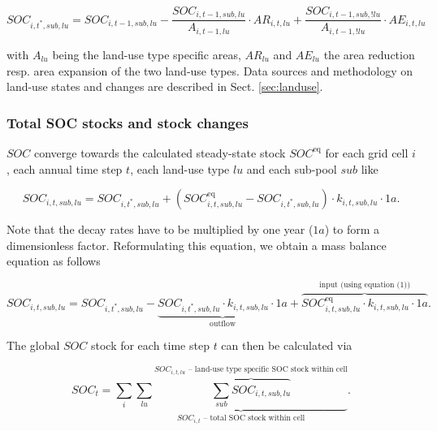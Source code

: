\documentclass[gc, manuscript]{copernicus}
\begin{document}
\begin{equation}
SOC_{i,t^*,sub,lu} = SOC_{i,t-1,sub,lu} - \frac{SOC_{i,t-1,sub,lu}}{A_{i,t-1,lu}} \cdot  AR_{i,t,lu} + \frac{SOC_{i,t-1,sub,!lu}}{A_{i,t-1,!lu}} \cdot  AE_{i,t,lu}
\label{eq:ctransfer}
\end{equation}

with \(A_{lu}\) being the land-use type specific areas, \(AR_{lu}\) and \(AE_{lu}\) the area reduction resp. area expansion of the two land-use types. Data sources and methodology on land-use states and changes are described in Sect. \ref{sec:landuse}.

\hypertarget{sec:totalsoc}{%
\subsubsection{Total SOC stocks and stock changes}\label{sec:totalsoc}}

\(SOC\) converge towards the calculated steady-state stock \(SOC^{\mathrm{eq}}\) for each grid cell \(i\), each annual time step \(t\), each land-use type \(lu\) and each sub-pool \(sub\) like

\begin{equation}
SOC_{i,t,sub,lu} = SOC_{i,t^*,sub,lu} + (SOC^{\mathrm{eq}}_{i,t,sub,lu} - SOC_{i,t^*,sub,lu}) \cdot k_{i,t,sub,lu} \cdot 1\unit{a}.
\label{eq:SOCstate}
\end{equation}

Note that the decay rates have to be multiplied by one year (\(1a\)) to form a dimensionless factor.
Reformulating this equation, we obtain a mass balance equation as follows

\begin{equation}
SOC_{i,t,sub,lu} = SOC_{i,t^*,sub,lu} - \underbrace{SOC_{i,t^*,sub,lu} \cdot k_{i,t,sub,lu} \cdot 1\unit{a}}_{\text{outflow}} + \overbrace{SOC^{\mathrm{eq}}_{i,t,sub,lu} \cdot k_{i,t,sub,lu} \cdot 1\unit{a}}^{\text{input (using equation (1))}}.
\label{eq:steadystate2budget}
\end{equation}

The global \(SOC\) stock for each time step \(t\) can then be calculated via

\begin{equation}
SOC_{t} = \sum_{i} \underbrace{\sum_{lu} \overbrace{\sum_{sub} SOC_{i,t,sub,lu}}^{\text{$SOC_{i,t,lu}$ -- land-use type specific SOC stock within cell}}}_{\text{$SOC_{i,t}$ -- total SOC stock within cell}}.
\label{eq:totalstock}
\end{equation}
\end{document}
